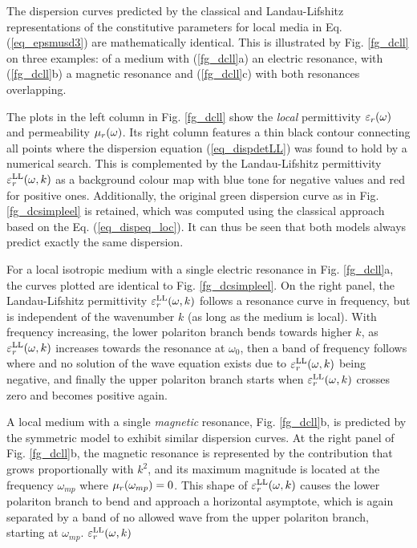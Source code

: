 The dispersion curves predicted by the classical and Landau-Lifshitz representations of the constitutive parameters for local media in Eq. (\ref{eq_epsmusd3}) are mathematically identical. This is illustrated by Fig. \ref{fg_dcll} on three examples: of a medium with (\ref{fg_dcll}a) an electric resonance, with (\ref{fg_dcll}b) a magnetic resonance and (\ref{fg_dcll}c) with both resonances overlapping. 

The plots in the left column in Fig. \ref{fg_dcll} show the \textit{local} permittivity $\varepsilon_r(\omega)$ and permeability $\mu_r(\omega)$.
Its right column features a thin black contour connecting all points where the dispersion equation (\ref{eq_dispdetLL}) was found to hold by a numerical search.
This is complemented by the Landau-Lifshitz permittivity $\varepsilon_r^\text{LL}(\omega, k)$ as a background colour map with blue tone for negative values and red for positive ones. 
Additionally, the original green dispersion curve as in Fig. \ref{fg_dcsimpleel} is retained, which was computed using the classical approach based on the Eq. (\ref{eq_dispeq_loc}). It can thus be seen that both models always predict exactly the same dispersion.

For a local isotropic medium with a single electric resonance in Fig. \ref{fg_dcll}a, the curves plotted are identical to Fig. \ref{fg_dcsimpleel}. On the right panel, the Landau-Lifshitz permittivity $\varepsilon_r^\text{LL}(\omega, k)$ follows a resonance curve in frequency, but is independent of the wavenumber $k$ (as long as the medium is local). With frequency increasing, the lower polariton branch bends towards higher $k$, as $\varepsilon_r^\text{LL}(\omega, k)$ increases towards the resonance at $\omega_0$, then a band of frequency follows where and no solution of the wave equation %
exists due to $\varepsilon_r^\text{LL}(\omega, k)$ being negative, and finally the upper polariton branch starts when $\varepsilon_r^\text{LL}(\omega, k)$ crosses zero and becomes positive again.

A local medium with a single \textit{magnetic} resonance, Fig. \ref{fg_dcll}b, is predicted by the symmetric model to exhibit similar dispersion curves. At the right panel of Fig. \ref{fg_dcll}b, the magnetic resonance is represented by the
contribution that grows proportionally with $k^2$, and its maximum magnitude is located at the frequency $\omega_{mp}$ where $\mu_r(\omega_{mp}) = 0$. This shape of $\varepsilon_r^\text{LL}(\omega, k)$ causes the lower polariton branch to bend and approach a horizontal asymptote, which is again separated by a band of no allowed wave from the upper polariton branch, starting at $\omega_{mp}$.
$\varepsilon_r^\text{LL}(\omega, k)$

